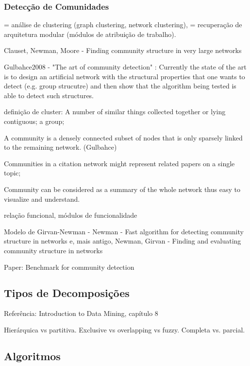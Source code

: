 \documentclass{article}
\begin{document}
\subsubsection{Detecção de Comunidades}

= análise de clustering (graph clustering, network clustering), = recuperação de arquitetura modular (módulos de atribuição de trabalho).

Clauset, Newman, Moore - Finding community structure in very large networks \cite{Clauset2004}

Gulbahce2008 - "The art of community detection" \cite{Gulbahce2008}: Currently the state of the art is to design an artificial network with the structural properties that one wants to detect (e.g. group strucutre) and then show that the algorithm being tested is able to detect such structures. 

definição de cluster: A number of similar things collected together or lying contiguous; a group;

A community is
a densely connected subset of nodes that is only sparsely
linked to the remaining network. (Gulbahce)

Communities in a citation network might represent
related papers on a single topic;

Community can be considered as a summary of
the whole network thus easy to visualize and
understand.

relação funcional, módulos de funcionalidade


Modelo de Girvan-Newman - Newman - Fast algorithm for detecting community structure in networks \cite{Newman2004b} e, mais antigo, Newman, Girvan - Finding and evaluating community structure in networks \cite{Newman2004a}

Paper: Benchmark for community detection \cite{Lancichinetti2008}


\subsection{Tipos de Decomposições}

Referência: Introduction to Data Mining, capítulo 8 \cite{Tan2005}

Hierárquica vs partitiva.
Exclusive vs overlapping vs fuzzy.
Completa vs. parcial.

\subsection{Algoritmos}
\end{document}
